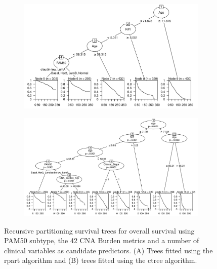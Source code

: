 \begin{figure}[!htb]
\centering

\vspace{1cm}

\begin{subfigure}{\textwidth}
\subcaption{}
\includegraphics[width=1\textwidth]{../figures/Appendices/Appendix_B/Clin_PA_PartyKit_Survival_Burden_OS_PAM50.png}
\end{subfigure}

\vspace{2cm}

\begin{subfigure}{\textwidth}
\subcaption{}
\includegraphics[width=1\textwidth]{../figures/Appendices/Appendix_B/Clin_PA_Ctree_Survival_Burden_OS_PAM50.png}
\end{subfigure}

\vspace{1cm}

\caption[Recursive partitioning survival trees for overall survival using PAM50 subtype, the 42 CNA Burden metrics and a number of clinical variables as candidate predictors.]{Recursive partitioning survival trees for overall survival using PAM50 subtype, the 42 CNA Burden metrics and a number of clinical variables as candidate predictors. (A) Trees fitted using the rpart algorithm and (B) trees fitted using the ctree algorithm.}
\end{figure}

